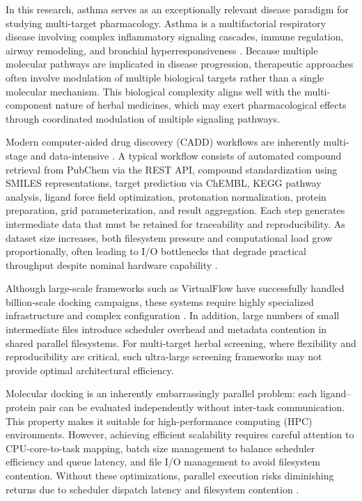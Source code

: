 \documentclass[11pt,a4paper]{article}
\begin{document}
In this research, asthma serves as an exceptionally relevant disease paradigm for studying multi-target pharmacology. Asthma is a multifactorial respiratory disease involving complex inflammatory signaling cascades, immune regulation, airway remodeling, and bronchial hyperresponsiveness \cite{gina2023,vos2020}. Because multiple molecular pathways are implicated in disease progression, therapeutic approaches often involve modulation of multiple biological targets rather than a single molecular mechanism. This biological complexity aligns well with the multi-component nature of herbal medicines, which may exert pharmacological effects through coordinated modulation of multiple signaling pathways.

Modern computer-aided drug discovery (CADD) workflows are inherently multi-stage and data-intensive \cite{siddiqui2025,gupta2024}. A typical workflow consists of automated compound retrieval from PubChem via the REST API, compound standardization using SMILES representations, target prediction via ChEMBL, KEGG pathway analysis, ligand force field optimization, protonation normalization, protein preparation, grid parameterization, and result aggregation. Each step generates intermediate data that must be retained for traceability and reproducibility. As dataset size increases, both filesystem pressure and computational load grow proportionally, often leading to I/O bottlenecks that degrade practical throughput despite nominal hardware capability \cite{roy2024}.

Although large-scale frameworks such as VirtualFlow have successfully handled billion-scale docking campaigns, these systems require highly specialized infrastructure and complex configuration \cite{gorgulla2020,gorgulla2023}. In addition, large numbers of small intermediate files introduce scheduler overhead and metadata contention in shared parallel filesystems. For multi-target herbal screening, where flexibility and reproducibility are critical, such ultra-large screening frameworks may not provide optimal architectural efficiency.

Molecular docking is an inherently embarrassingly parallel problem: each ligand--protein pair can be evaluated independently without inter-task communication. This property makes it suitable for high-performance computing (HPC) environments. However, achieving efficient scalability requires careful attention to CPU-core-to-task mapping, batch size management to balance scheduler efficiency and queue latency, and file I/O management to avoid filesystem contention. Without these optimizations, parallel execution risks diminishing returns due to scheduler dispatch latency and filesystem contention \cite{chowdhury2020}.
\end{document}
